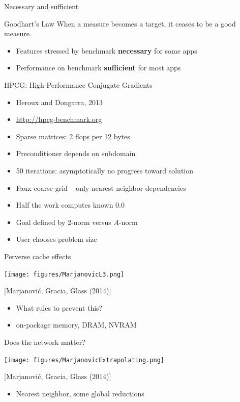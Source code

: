 \documentclass{beamer}
\begin{document}
\begin{frame}{Necessary and sufficient}
  \begin{block}{Goodhart's Law}
    When a measure becomes a target, it ceases to be a good measure.
  \end{block}

  \begin{itemize}
  \item Features stressed by benchmark \textbf{necessary} for some apps
  \item Performance on benchmark \textbf{sufficient} for most apps
  \end{itemize}
\end{frame}

\begin{frame}{HPCG: High-Performance Conjugate Gradients}
  \begin{itemize}
  \item Heroux and Dongarra, 2013
  \item \url{http://hpcg-benchmark.org}
  \item Sparse matrices: 2 flops per 12 bytes
  \item Preconditioner depends on subdomain
  \item 50 iterations: asymptotically no progress toward solution
  \item Faux coarse grid -- only nearest neighbor dependencies
  \item Half the work computes known 0.0
  \item Goal defined by 2-norm versus $A$-norm
  \item User chooses problem size
  \end{itemize}
\end{frame}

\begin{frame}{Perverse cache effects}
  \begin{center}
    \texttt{[image: figures/MarjanovicL3.png]} \\
  \end{center}
  {\scriptsize [Marjanovi\'c, Gracia, Glass (2014)]}
  \begin{itemize}
  \item What rules to prevent this?
  \item on-package memory, DRAM, NVRAM
  \end{itemize}
\end{frame}

\begin{frame}{Does the network matter?}
  \begin{center}
    \texttt{[image: figures/MarjanovicExtrapolating.png]} \\
  \end{center}
  {\scriptsize [Marjanovi\'c, Gracia, Glass (2014)]}
  \begin{itemize}
  \item Nearest neighbor, some global reductions
  \end{itemize}
\end{frame}
\end{document}
